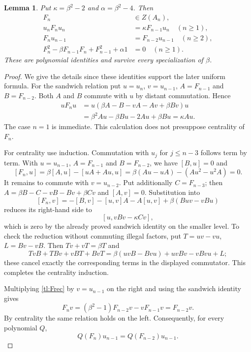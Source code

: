 \documentclass[a4paper,11pt,oneside,reqno]{amsart}
\newtheorem{lemma}[theorem]{Lemma}
\theoremstyle{definition}
\numberwithin{equation}{section}
\begin{document}
	\begin{lemma}\label{tl:F-identities}
		Put $\kappa=\beta^2-2$ and $\alpha=\beta^2-4$.  Then
		\begin{align}
			F_n&\in Z(A_n),\label{tl:Fcentral}\\
			u_nF_nu_n&=\kappa F_{n-1}u_n\quad(n\ge1),\label{tl:Fsandwich}\\
			F_nu_{n-1}&=F_{n-2}u_{n-1}\quad(n\ge2),\label{tl:Fcap}\\
			F_n^2-\beta F_{n-1}F_n+F_{n-1}^2+\alpha1&=0\quad(n\ge1).
			\label{tl:Fquad}
		\end{align}
		These are polynomial identities and survive every specialization of
		$\beta$.
	\end{lemma}
	\begin{proof}
		We give the details since these identities support the later uniform
		formula.  For the sandwich relation put $u=u_n$, $v=u_{n-1}$,
		$A=F_{n-1}$ and $B=F_{n-2}$.  Both $A$ and $B$ commute with $u$
		by distant commutation.  Hence
		\[
		\begin{aligned}
			uF_nu&=u(\beta A-B-vA-Av+\beta Bv)u\\
			&=\beta^2Au-\beta Bu-2Au+\beta Bu=\kappa Au.
		\end{aligned}
		\]
		The case $n=1$ is immediate.  This calculation does not presuppose
		centrality of $F_n$.
		
		For centrality use induction.  Commutation with $u_j$ for
		$j\le n-3$ follows term by term.  With $u=u_{n-1}$,
		$A=F_{n-1}$ and $B=F_{n-2}$, we have $[B,u]=0$ and
		\[
		[F_n,u]=\beta[A,u]-[uA+Au,u]
		=\beta(Au-uA)-(Au^2-u^2A)=0.
		\]
		It remains to commute with $v=u_{n-2}$.  Put additionally
		$C=F_{n-3}$; then
		$A=\beta B-C-vB-Bv+\beta Cv$ and $[A,v]=0$.
		Substitution into
		\[
		[F_n,v]=-[B,v]-[u,v]A-A[u,v]+\beta(Buv-vBu)
		\]
		reduces its right-hand side to
		\[
		[u,vBv-\kappa Cv],
		\]
		which is zero by the already proved sandwich identity on the smaller
		level.  To check the reduction without commuting illegal factors, put
		$T=uv-vu$, $L=Bv-vB$.  Then $Tv+vT=\beta T$ and
		\[
		TvB+TBv+vBT+BvT
		=\beta(uvB-Bvu)+uvBv-vBvu+L;
		\]
		these cancel exactly the corresponding terms in the displayed
		commutator.  This completes the centrality induction.
		
		Multiplying \eqref{tl:Frec} by $v=u_{n-1}$ on the right and using
		the sandwich identity gives
		\[
		F_nv=(\beta^2-1)F_{n-2}v-vF_{n-1}v=F_{n-2}v.
		\]
		By centrality the same relation holds on the left.  Consequently,
		for every polynomial $Q$,
		\begin{equation}\label{tl:polycap}
			Q(F_n)u_{n-1}=Q(F_{n-2})u_{n-1}.
		\end{equation}
		

\end{proof}
\end{document}

